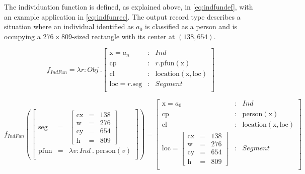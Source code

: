 
The individuation function is defined, as explained above, in \autoref{eq:indfundef}, with an example application in \autoref{eq:indfunrec}.
The output record type describes a situation where an individual identified as $a_0$ is classified as a person and is occupying a $276 \times 809$-sized rectangle with its center at $(138, 654)$.

\begin{equation}\label{eq:indfundef}
f_{IndFun} = \lambda r : Obj\ . \left[\begin{array}{rcl}
    \text{x} = a_n &:& Ind \\
    \text{cp} &:& r.\text{pfun}(\text{x}) \\
    \text{cl} &:& \text{location}(\text{x}, \text{loc}) \\
    \text{loc} = r.\text{seg} &:& Segment\\
\end{array}\right]
\end{equation}

\begin{equation}\label{eq:indfunrec}
f_{IndFun}(
\left[\begin{array}{rcl}
\text{seg} &=& \left[\begin{array}{rcl}
\text{cx} &=& 138\\
\text{w} &=& 276\\
\text{cy} &=& 654\\
\text{h} &=& 809
\end{array}\right]\\
\text{pfun} &=& \lambda v:Ind\ .\ \text{person}(v)\\
\end{array}\right]
) =
\left[\begin{array}{rcl}
    \text{x} = a_0 &:& Ind \\
    \text{cp} &:& \text{person}(\text{x}) \\
    \text{cl} &:& \text{location}(\text{x}, \text{loc}) \\
    \text{loc} = \left[\begin{array}{rcl}
		\text{cx} &=& 138\\
		\text{w} &=& 276\\
		\text{cy} &=& 654\\
		\text{h} &=& 809
		\end{array}\right] &:& Segment\\
\end{array}\right]
\end{equation}



